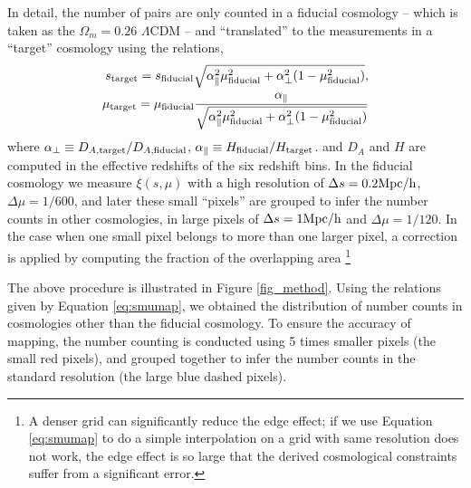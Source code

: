 \documentclass[iop]{emulateapj}
\begin{document}
In detail, the number of pairs are only counted in a fiducial cosmology
-- which is taken as the $\Omega_m=0.26$ $\Lambda$CDM --
and ``translated'' to the measurements in a ``target'' cosmology using the relations, 
\begin{eqnarray}\label{eq:smumap}
 s_{\rm target} = s_{\rm fiducial} \sqrt{\alpha_{\parallel}^2 \mu_{\rm fiducial}^2+\alpha_{\bot}^2(1-\mu_{\rm fiducial}^2)}, \\
 \mu_{\rm target} = \mu_{\rm fiducial} \frac{\alpha_\parallel}
 {\sqrt{\alpha_{\parallel}^2 \mu_{\rm fiducial}^2 +\alpha_{\bot}^2(1-\mu_{\rm fiducial}^2)}}
\end{eqnarray}
where $\alpha_{\bot}\equiv D_{A,\rm target}/D_{A,\rm fiducial}$,
$\alpha_{\parallel}\equiv H_{\rm fiducial}/H_{\rm target}$.
and $D_A$ and $H$ are computed in the effective redshifts of the six redshift bins.
In the fiducial cosmology
we measure $\xi(s,\mu)$ with a high resolution of
$\Delta s = 0.2 {\rm Mpc/h}$, $\Delta \mu = 1/600$,
and later these small ``pixels'' are grouped to infer 
the number counts in other cosmologies, 
in large pixels of $\Delta s = 1 {\rm Mpc/h}$ and $\Delta \mu = 1/120$.
In the case when one small pixel belongs to more than one larger pixel,
a correction is applied by computing the fraction of the overlapping area
\footnote{A denser grid can significantly reduce the edge effect;
if we use Equation \ref{eq:smumap} to do a simple interpolation on a grid with same resolution does not work,
the edge effect is so large that the derived cosmological constraints suffer from a significant error.}

The above procedure is illustrated in Figure \ref{fig_method}.
Using the relations given by Equation \ref{eq:smumap},
we obtained the distribution of number counts in cosmologies other than the fiducial cosmology.
To ensure the accuracy of mapping, the number counting is conducted using 5 times smaller pixels (the small red pixels), 
and grouped together to infer the number counts in the standard resolution (the large blue dashed pixels).
\end{document}
